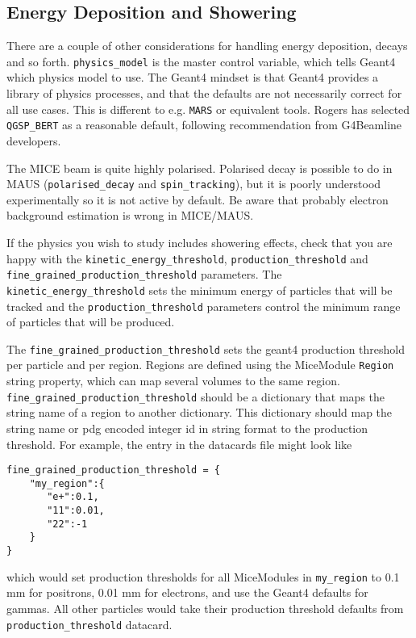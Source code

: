 \subsection{Energy Deposition and Showering}
There are a couple of other considerations for handling energy deposition, decays and so forth. \verb|physics_model| is the master control variable, which tells Geant4 which physics model to use. The Geant4 mindset is that Geant4 provides a library of physics processes, and that the defaults are not necessarily correct for all use cases. This is different to e.g. \verb|MARS| or equivalent tools. Rogers has selected \verb|QGSP_BERT| as a reasonable default, following recommendation from G4Beamline developers.

The MICE beam is quite highly polarised. Polarised decay is possible to do in MAUS (\verb|polarised_decay| and \verb|spin_tracking|), but it is poorly understood experimentally so it is not active by default. Be aware that probably electron background estimation is wrong in MICE/MAUS.

If the physics you wish to study includes showering effects, check that you are happy with the \verb|kinetic_energy_threshold|, \verb|production_threshold| and \verb|fine_grained_production_threshold| parameters. The \verb|kinetic_energy_threshold| sets the minimum energy of particles that will be tracked and the \verb|production_threshold| parameters control the minimum range of particles that will be produced. 

The \verb|fine_grained_production_threshold| sets the geant4 production threshold per particle and per region. Regions are defined using the MiceModule \verb|Region| string property, which can map several volumes to the same region. \verb|fine_grained_production_threshold| should be a dictionary that maps the string name of a region to another dictionary. This dictionary should map the string name or pdg encoded integer id in string format to the production threshold. For example, the entry in the datacards file might look like
\begin{verbatim}
fine_grained_production_threshold = {
    "my_region":{
       "e+":0.1,
       "11":0.01,
       "22":-1
    }
}
\end{verbatim}
which would set production thresholds for all MiceModules in \verb|my_region| to 0.1 mm for positrons, 0.01 mm for electrons, and use the Geant4 defaults for gammas. All other particles would take their production threshold defaults from \verb|production_threshold| datacard.

